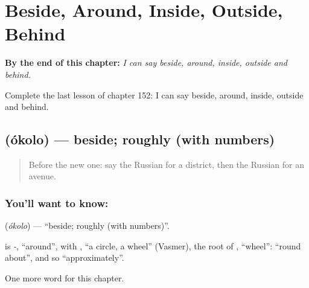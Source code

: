 
\chapter{Beside, Around, Inside, Outside, Behind}
\label{ch:ru-beside-around-inside-outside-behind}

\begin{chapteropening}
\textbf{By the end of this chapter:} \emph{I can say beside, around, inside, outside and behind.}

Complete the last lesson of chapter 152: I can say beside, around, inside, outside and behind.
\end{chapteropening}

\section[\texorpdfstring{\ru{около} (ókolo)}{около (ókolo)}]{ (ókolo) — beside; roughly (with numbers)}

\label{lesson:RU-C152-okolo}



\begin{quote}
Before the new one: say the Russian for a district, then the Russian for an avenue.
\end{quote}

\subsection*{You'll want to know: }
\textbf{} (\emph{ókolo}) — \textquotedblleft{}beside; roughly (with numbers)\textquotedblright{}.

\begin{cousinweb}
\textbf{} is \emph{-}, \textquotedblleft{}around\textquotedblright{}, with \emph{}, \textquotedblleft{}a circle, a wheel\textquotedblright{} (Vasmer), the root of \emph{}, \textquotedblleft{}wheel\textquotedblright{}: \textquotedblleft{}round about\textquotedblright{}, and so \textquotedblleft{}approximately\textquotedblright{}.
\end{cousinweb}

\begin{grammarlens}[title={What you've built}]
One more word for this chapter.
\end{grammarlens}

